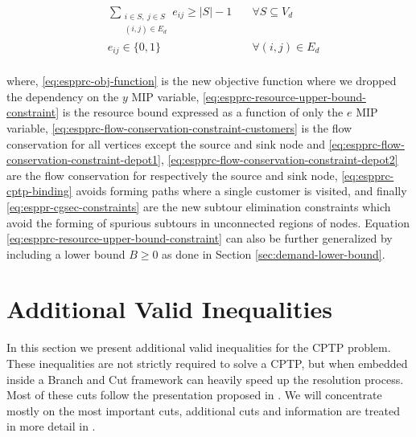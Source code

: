 \begin{align}
	                                & \sum_{\substack{i \in S,\ j \in S                                                                                                                                                          \\ (i, j) \in E_d}} e_{ij} \ge |S| - 1                                                                   & \quad \forall S \subseteq V_d \label{eq:esppr-cgsec-constraints} \\
	                                & e_{ij}                   \in \lbrace 0, 1 \rbrace                                                          & \quad \forall (i, j) \in E_d               \label{eq:espprc-e-mip-var-bounds} \\
\end{align}

where, \eqref{eq:espprc-obj-function} is the new objective function where we dropped the dependency on the $y$ MIP variable,
\eqref{eq:espprc-resource-upper-bound-constraint} is the resource bound expressed as a function of only the $e$ MIP variable,
\eqref{eq:espprc-flow-conservation-constraint-customers} is the flow conservation for all vertices except the source and sink node
and \eqref{eq:espprc-flow-conservation-constraint-depot1}, \eqref{eq:espprc-flow-conservation-constraint-depot2} are the flow conservation for respectively the source and sink node,
\eqref{eq:espprc-cptp-binding} avoids forming paths where a single customer is visited,
and finally \eqref{eq:esppr-cgsec-constraints} are the new subtour elimination constraints which avoid the forming of spurious subtours in unconnected regions of nodes.
Equation \eqref{eq:espprc-resource-upper-bound-constraint} can also be further generalized by including a lower bound $B \ge 0$ as done in Section \ref{sec:demand-lower-bound}.





\section{Additional Valid Inequalities}\label{sec:additional-valid-inequalities}

In this section we present additional valid inequalities for the CPTP problem.
These inequalities are not strictly required to solve a CPTP, but when embedded inside a Branch and Cut framework can heavily speed up the resolution process.
Most of these cuts follow the presentation proposed in \cite{Jepsen2014}.
We will concentrate mostly on the most important cuts, additional cuts and information are treated in more detail in \cite{Jepsen2014}.

